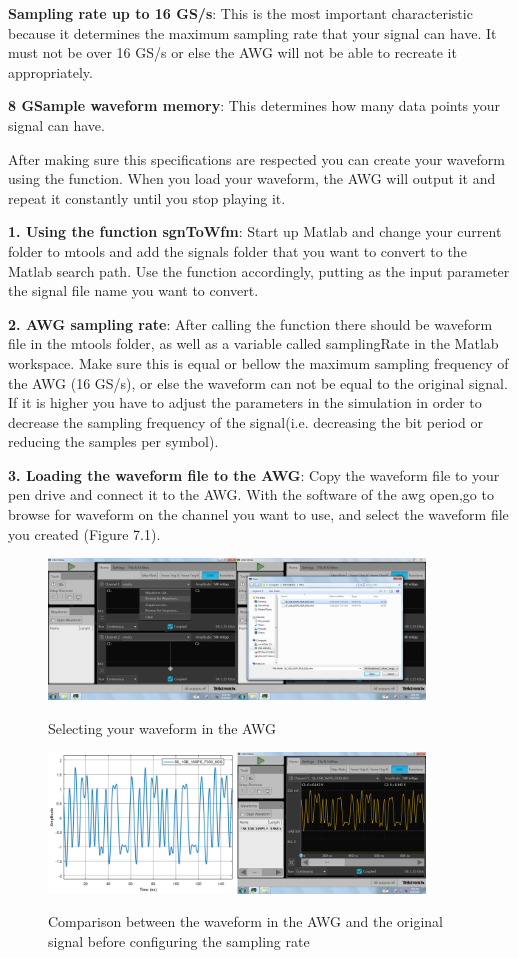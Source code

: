 \textbf{Sampling rate up to 16 GS/s}: This is the most important characteristic  because it determines the maximum sampling rate that your signal can have. It must not be over 16 GS/s or else the AWG will not be able to recreate it appropriately.
\bigskip

\textbf{8 GSample waveform memory}: This determines how many data points your signal can have.
\bigskip

After making sure this specifications are respected you can create your waveform using the function. When you load your waveform, the AWG will output it and repeat it constantly until you stop playing it.
\bigskip

\textbf{1. Using the function sgnToWfm}:
Start up Matlab and change your current folder to mtools and add the signals folder that you want to convert to the Matlab search path. Use the function accordingly, putting as the input parameter the signal file name you want to convert.
\bigskip

\noindent
\textbf{2. AWG sampling rate}:
After calling the function there should be waveform file in the mtools folder, as well as a variable called samplingRate in the Matlab workspace. Make sure this is equal or bellow the maximum sampling frequency of the AWG (16 GS/s), or else the waveform can not be equal to the original signal. If it is higher you  have to adjust the parameters in the simulation in order to decrease the sampling frequency of the signal(i.e. decreasing the bit period or reducing the samples per symbol).
\bigskip

\noindent
\textbf{3. Loading the waveform file to the AWG}:
Copy the waveform file to your pen drive and connect it to the AWG. With the software of the awg open,go to browse for waveform on the channel you want to use, and select the waveform file you created (Figure 7.1).

\begin{figure}[h]
	\centering
	\includegraphics[width=10cm]{../mtools/sgnToWfm/figures/tutorial1}
	\label{TUT_SelectingWFM}\caption{Selecting your waveform in the AWG}
\end{figure}
\begin{figure}[h]
	\centering
	\includegraphics[width=10cm]{../mtools/sgnToWfm/figures/tutorial2}
	\label{TUT_CompBad}\caption{Comparison between the waveform in the AWG and the original signal before configuring the sampling rate}
\end{figure}

